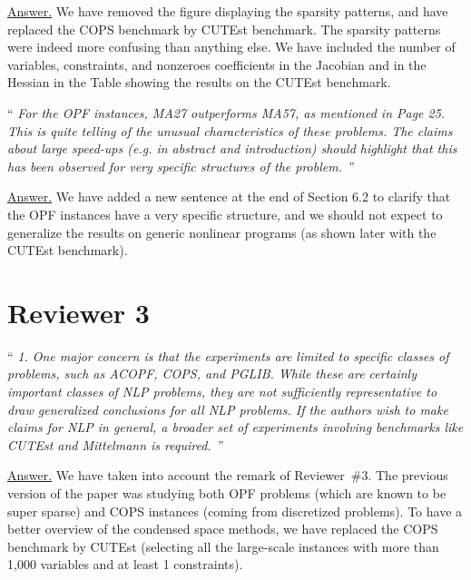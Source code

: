 \documentclass[10pt,a4paper]{article}
\newenvironment{quotereviewer}{\vspace{.5cm}{\underline\reviewername} ``\it\footnotesize}{''}
\newcommand{\answer}{\vspace{1mm}\underline{Answer.} }
\begin{document}
\answer
We have removed the figure displaying the sparsity patterns, and have replaced
the COPS benchmark by CUTEst benchmark. The sparsity patterns
were indeed more confusing than anything else. We have included the number of variables,
constraints, and nonzeroes coefficients in the Jacobian and in the Hessian in the Table showing the results on the CUTEst benchmark.

\begin{quotereviewer}
For the OPF instances, MA27 outperforms MA57, as mentioned in Page 25. This is quite telling of the unusual characteristics of these problems. The claims about large speed-ups (e.g. in abstract and introduction) should highlight that this has been observed for very specific structures of the problem.
\end{quotereviewer}

\answer
We have added a new sentence at the end of Section 6.2 to clarify that the OPF
instances have a very specific structure, and we should not expect to generalize
the results on generic nonlinear programs (as shown later with the CUTEst benchmark).



\section{Reviewer 3}
\def\reviewername{Reviewer~\#3}
\bigskip


\begin{quotereviewer}
1. One major concern is that the experiments are limited to speciﬁc classes of problems, such as
ACOPF, COPS, and PGLIB. While these are certainly important classes of NLP problems,
they are not suﬃciently representative to draw generalized conclusions for all NLP problems.
If the authors wish to make claims for NLP in general, a broader set of experiments involving
benchmarks like CUTEst and Mittelmann is required.
\end{quotereviewer}

\answer
We have taken into account the remark of \reviewername. The previous version
of the paper was studying both OPF problems (which are known to be super sparse)
and COPS instances (coming from discretized problems). To have a better
overview of the condensed space methods, we have replaced the COPS benchmark
by CUTEst (selecting all the large-scale instances with more than 1,000
variables and at least 1 constraints).
\end{document}
